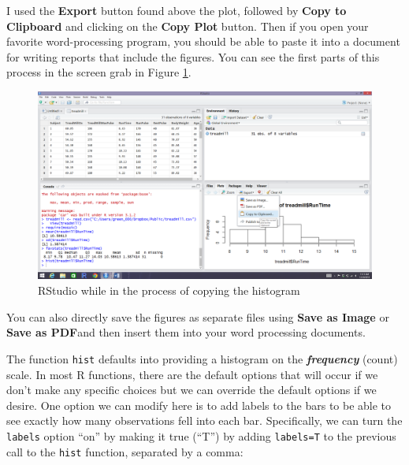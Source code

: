 \documentclass[]{book}
\newenvironment{Shaded}{\begin{snugshade}}{\end{snugshade}}
\newcommand{\KeywordTok}[1]{\textcolor[rgb]{0.13,0.29,0.53}{\textbf{{#1}}}}
\newcommand{\DataTypeTok}[1]{\textcolor[rgb]{0.13,0.29,0.53}{{#1}}}
\newcommand{\NormalTok}[1]{{#1}}
\begin{document}
I used the \textbf{Export} button found above the plot, followed by
\textbf{Copy to Clipboard} and clicking on the \textbf{Copy Plot}
button. Then if you open your favorite word-processing program, you
should be able to paste it into a document for writing reports that
include the figures. You can see the first parts of this process in the
screen grab in Figure \ref{fig:Figure6}.



\begin{figure}
\includegraphics[width=26.67in]{chapter0_files/image010} \caption{RStudio while in the process of copying the histogram}\label{fig:Figure6}
\end{figure}

You can also directly save the figures as separate files using
\textbf{Save as Image} or \textbf{Save as PDF}and then insert them into
your word processing documents.

The function \texttt{hist} defaults into providing a histogram on the
\textbf{\emph{frequency}} (count) scale. In most R functions, there are
the default options that will occur if we don't make any specific
choices but we can override the default options if we desire. One option
we can modify here is to add labels to the bars to be able to see
exactly how many observations fell into each bar. Specifically, we can
turn the \texttt{labels} option ``on'' by making it true (``T'') by
adding \texttt{labels=T} to the previous call to the \texttt{hist}
function, separated by a comma:



\begin{Shaded}
\end{Shaded}
\end{document}
